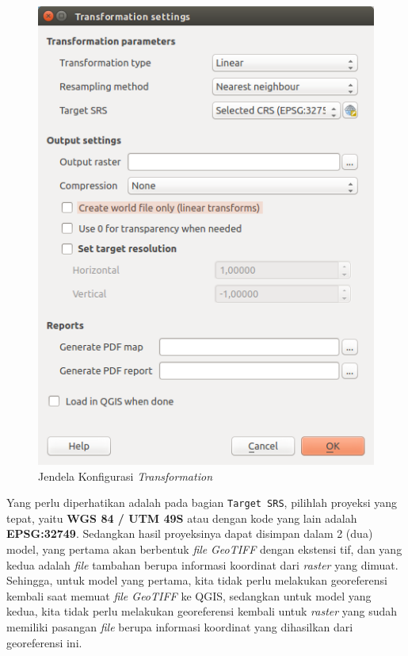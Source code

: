 \begin{enumerate}[1.]
  \begin{figure}[H]
    \centering
    \includegraphics[width=1\textwidth]{./resources/026-transformation-win}
    \caption{Jendela Konfigurasi \textit{Transformation}}
    \label{fig:transformationwin}
  \end{figure}
  
  Yang perlu diperhatikan adalah pada bagian \verb|Target SRS|, pilihlah proyeksi yang tepat, yaitu \textbf{WGS 84 / UTM 49S} atau dengan kode yang lain adalah \textbf{EPSG:32749}. Sedangkan hasil proyeksinya dapat disimpan dalam 2 (dua) model, yang pertama akan berbentuk \textit{file} \textit{GeoTIFF} dengan ekstensi tif, dan yang kedua adalah \textit{file} tambahan berupa informasi koordinat dari \textit{raster} yang dimuat. Sehingga, untuk model yang pertama, kita tidak perlu melakukan georeferensi kembali saat memuat \textit{file GeoTIFF} ke QGIS, sedangkan untuk model yang kedua, kita tidak perlu melakukan georeferensi kembali untuk \textit{raster} yang sudah memiliki pasangan \textit{file} berupa informasi koordinat yang dihasilkan dari georeferensi ini.
  

\end{enumerate}
